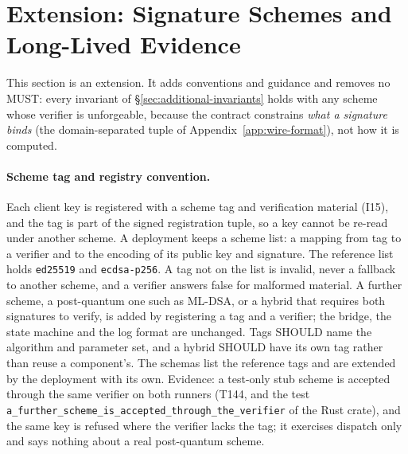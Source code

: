\section{Extension: Signature Schemes and Long-Lived Evidence}
\label{sec:ext-schemes}

This section is an extension. It adds conventions and guidance and removes
no MUST: every invariant of \S\ref{sec:additional-invariants} holds with
any scheme whose verifier is unforgeable, because the contract constrains
\emph{what a signature binds} (the domain-separated tuple of
Appendix~\ref{app:wire-format}), not how it is computed.

\paragraph{Scheme tag and registry convention.} Each client key is
registered with a scheme tag and verification material (I15), and the
tag is part of the signed registration tuple, so a key cannot be
re-read under another scheme. A deployment keeps a scheme list: a mapping
from tag to a verifier and to the encoding of its public key and
signature. The reference list holds \texttt{ed25519} and
\texttt{ecdsa-p256}. A tag not on the list is invalid, never a fallback to
another scheme, and a verifier answers false for malformed material. A
further scheme, a post-quantum one such as ML-DSA, or a hybrid that
requires both signatures to verify, is added by registering a tag and a
verifier; the bridge, the state machine and the log format are unchanged.
Tags SHOULD name the algorithm and parameter set, and a hybrid SHOULD have
its own tag rather than reuse a component's. The schemas list the
reference tags and are extended by the deployment with its own. Evidence:
a test-only stub scheme is accepted through the same verifier on both
runners (T144, and the test \texttt{a\_further\_scheme\_is\_accepted\_through\_the\_verifier}
of the Rust crate), and the same key is refused where the verifier lacks
the tag; it exercises dispatch only and says nothing about a real
post-quantum scheme.

